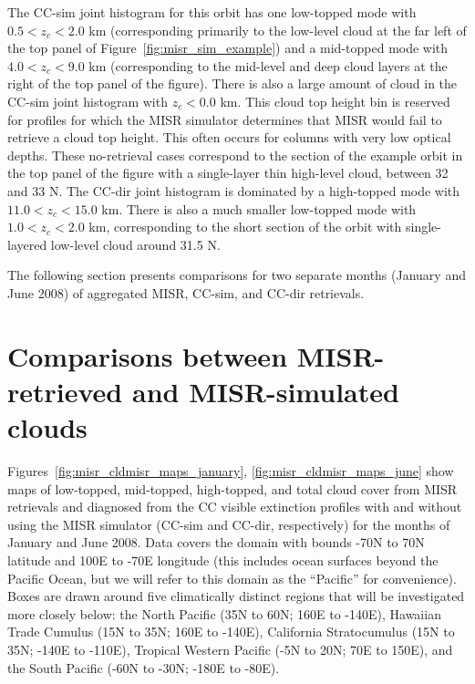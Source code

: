 The CC-sim joint histogram for this orbit has one low-topped mode with
\(0.5 < z_c < 2.0\) km (corresponding primarily to the low-level cloud
at the far left of the top panel of Figure~\ref{fig:misr_sim_example})
and a mid-topped mode with \(4.0 < z_c < 9.0\) km (corresponding to the
mid-level and deep cloud layers at the right of the top panel of the
figure). There is also a large amount of cloud in the CC-sim joint
histogram with \(z_c < 0.0\) km. This cloud top height bin is reserved
for profiles for which the MISR simulator determines that MISR would
fail to retrieve a cloud top height. This often occurs for columns with
very low optical depths. These no-retrieval cases correspond to the
section of the example orbit in the top panel of the figure with a
single-layer thin high-level cloud, between 32 and 33 N. The CC-dir
joint histogram is dominated by a high-topped mode with
\(11.0 < z_c < 15.0\) km. There is also a much smaller low-topped mode
with \(1.0 < z_c < 2.0\) km, corresponding to the short section of the
orbit with single-layered low-level cloud around 31.5 N.

The following section presents comparisons for two separate months
(January and June 2008) of aggregated MISR, CC-sim, and CC-dir
retrievals.

\section{Comparisons between MISR-retrieved and MISR-simulated
clouds}\label{sec:misrResults}

Figures~\ref{fig:misr_cldmisr_maps_january}, \ref{fig:misr_cldmisr_maps_june}
show maps of low-topped, mid-topped, high-topped, and total cloud cover
from MISR retrievals and diagnosed from the CC visible extinction
profiles with and without using the MISR simulator (CC-sim and CC-dir,
respectively) for the months of January and June 2008. Data covers the
domain with bounds -70N to 70N latitude and 100E to -70E longitude (this
includes ocean surfaces beyond the Pacific Ocean, but we will refer to
this domain as the ``Pacific'' for convenience). Boxes are drawn around
five climatically distinct regions that will be investigated more
closely below: the North Pacific (35N to 60N; 160E to -140E), Hawaiian
Trade Cumulus (15N to 35N; 160E to -140E), California Stratocumulus (15N
to 35N; -140E to -110E), Tropical Western Pacific (-5N to 20N; 70E to
150E), and the South Pacific (-60N to -30N; -180E to -80E).


